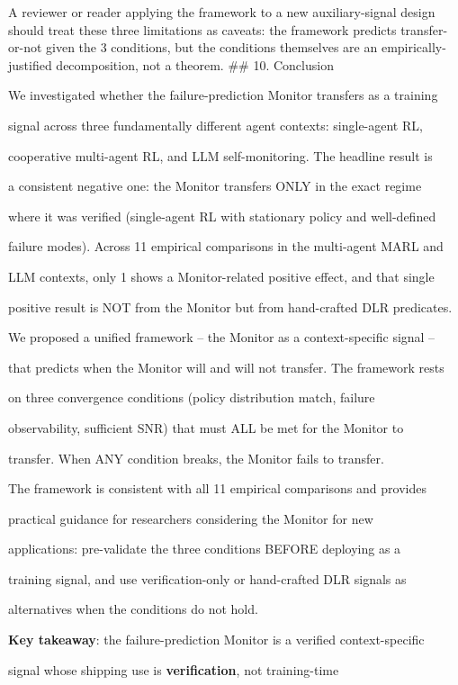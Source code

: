 \documentclass[11pt]{article}
\begin{document}
A reviewer or reader applying the framework to a new auxiliary-signal
design should treat these three limitations as caveats: the framework
predicts transfer-or-not given the 3 conditions, but the conditions
themselves are an empirically-justified decomposition, not a theorem.
\#\# 10. Conclusion

We investigated whether the failure-prediction Monitor transfers as a
training

signal across three fundamentally different agent contexts: single-agent
RL,

cooperative multi-agent RL, and LLM self-monitoring. The headline result
is

a consistent negative one: the Monitor transfers ONLY in the exact
regime

where it was verified (single-agent RL with stationary policy and
well-defined

failure modes). Across 11 empirical comparisons in the multi-agent MARL
and

LLM contexts, only 1 shows a Monitor-related positive effect, and that
single

positive result is NOT from the Monitor but from hand-crafted DLR
predicates.

We proposed a unified framework -- the Monitor as a context-specific
signal --

that predicts when the Monitor will and will not transfer. The framework
rests

on three convergence conditions (policy distribution match, failure

observability, sufficient SNR) that must ALL be met for the Monitor to

transfer. When ANY condition breaks, the Monitor fails to transfer.

The framework is consistent with all 11 empirical comparisons and
provides

practical guidance for researchers considering the Monitor for new

applications: pre-validate the three conditions BEFORE deploying as a

training signal, and use verification-only or hand-crafted DLR signals
as

alternatives when the conditions do not hold.

\textbf{Key takeaway}: the failure-prediction Monitor is a verified
context-specific

signal whose shipping use is \textbf{verification}, not training-time
\end{document}
